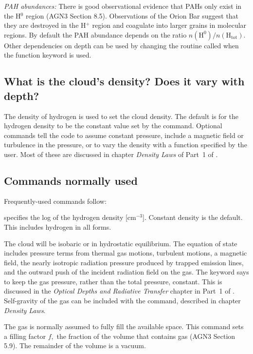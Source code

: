 \documentclass[12pt,twoside]{article}
\begin{document}
{\emph{PAH abundances:} There is good observational
evidence that PAHs only exist
in the H$^0$ region (AGN3 Section 8.5).  Observations of the Orion Bar suggest
that they are destroyed in the H$^+$ region and coagulate into larger grains
in molecular regions.  By default the PAH abundance depends on the ratio
$n(\mathrm{H}^0)/n(\mathrm{H}_\mathrm{tot})$.  Other
dependencies on depth can be used by changing the
routine called when the function keyword is used.

\subsection{What is the cloud's density?  Does it vary with depth?}

The density of hydrogen is used to set the cloud density.  The default
is for the hydrogen density to be the constant value set by the
 command.
Optional commands tell the code to assume constant pressure, include a
magnetic field or turbulence in the pressure, or to vary the density with
a function specified by the user.  Most of these are discussed in chapter
\emph{Density Laws} of Part~1 of \Hazy.

\subsection{Commands normally used}

Frequently-used commands follow:

 specifies the log of the
\label{command:hden}
hydrogen density [cm$^{-3}$].  Constant density
is the default.  This includes hydrogen in all forms.

\quad The cloud will be isobaric or
\label{command:ConstantPressure}
in hydrostatic equilibrium.  The equation
of state includes pressure terms from thermal gas motions, turbulent motions,
a magnetic field, the nearly isotropic radiation pressure produced by trapped
emission lines, and the outward push of the incident radiation field on
the gas.  The keyword  says to
keep the gas pressure, rather than the
total pressure, constant.
This is discussed in the
\emph{Optical Depths and Radiative Transfer} chapter in Part~1 of \Hazy.
Self-gravity of the gas can be included with the  command, described in chapter \emph{Density Laws}.

\quad  The gas is
\label{command:FillingFactor}
normally assumed to fully fill the available
space.  This command sets a filling factor $f,$ the fraction of the volume
that contains gas (AGN3 Section 5.9).  The remainder of the volume is a
vacuum.

}
\end{document}
